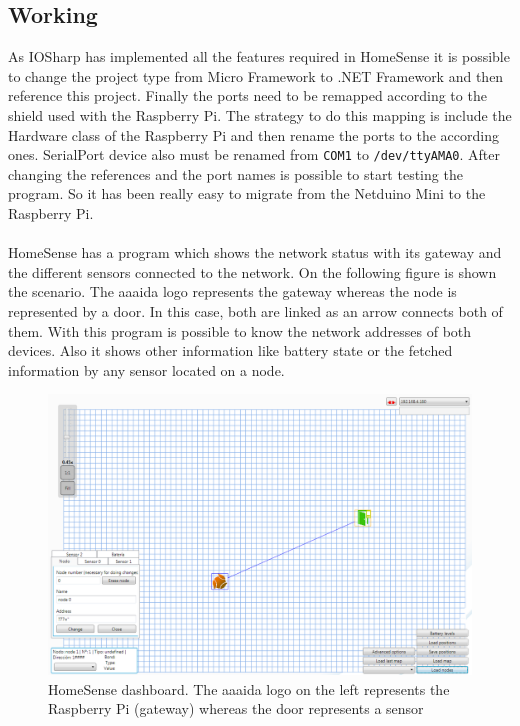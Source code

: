 \subsection{Working}\label{SS:IOEx-HomeSense-Working}
As IOSharp has implemented all the features required in HomeSense it is possible to change the project type from Micro Framework to .NET Framework and then reference this project. Finally the ports need to be remapped according to the shield used with the Raspberry Pi. The strategy to do this mapping is include the Hardware class of the Raspberry Pi and then rename the ports to the according ones. SerialPort device also must be renamed from \verb!COM1! to \verb!/dev/ttyAMA0!. After changing the references and the port names is possible to start testing the program. So it has been really easy to migrate from the Netduino Mini to the Raspberry Pi.
\\
\\
HomeSense has a program which shows the network status with its gateway and the different sensors connected to the network. On the following figure is shown the scenario. The aaaida logo represents the gateway whereas the node is represented by a door. In this case, both are linked as an arrow connects both of them. With this program is possible to know the network addresses of both devices. Also it shows other information like battery state or the fetched information by any sensor located on a node.
\begin{figure}[H]\begin{center}
 \centering
  \captionsetup{justification=centering}
  \includegraphics[width=1\textwidth]{pictures/examples/homesense-pillin}
  \caption{HomeSense dashboard. The aaaida logo on the left represents the Raspberry Pi (gateway)  whereas the door represents a sensor\label{fig:IOEx-HS-Dash}}
\end{center}\end{figure}

